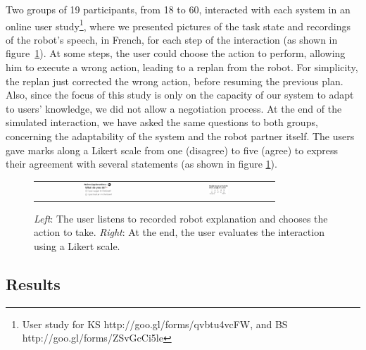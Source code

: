 Two groups of 19 participants, from 18 to 60, interacted with each system in an online user study\footnote{User study for KS http://goo.gl/forms/qvbtu4vcFW, and BS http://goo.gl/forms/ZSvGcCi5le}, where we presented pictures of the task state and recordings of the robot's speech, in French, for each step of the interaction (as shown in figure~\ref{fig:plan_management-user_study}).
At some steps, the user could choose the action to perform, allowing him to execute a wrong action, leading to a replan from the robot. For simplicity, the replan just corrected the wrong action, before resuming the previous plan. Also, since the focus of this study is only on the capacity of our system to adapt to users' knowledge, we did not allow a negotiation process.
At the end of the simulated interaction, we have asked the same questions to both groups, concerning the adaptability of the system and the robot partner itself. 
The users gave marks along a Likert scale from one (disagree) to five (agree) to express their agreement with several statements (as shown in figure \ref{fig:plan_management-user_study}).

\begin{figure}[ht!]
 \centering
 \begin{tabular}{cc}
  \includegraphics[width=0.24\textwidth]{img/plan_management/ustudy9.png} &
  \includegraphics[width=0.19\textwidth]{img/plan_management/ustudy11.png}
 \end{tabular} 
 \caption{\textit{Left}: The user listens to recorded robot explanation and chooses the action to take. \textit{Right}: At the end, the user evaluates the interaction using a Likert scale.}
 \label{fig:plan_management-user_study}
 \end{figure}

\subsection{Results}

